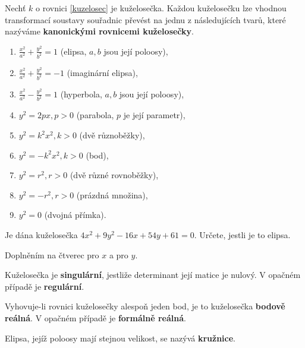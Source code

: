 \begin{definition}
    Nechť $k$ o rovnici \ref{kuzelosec} je kuželosečka. Každou kuželosečku lze
    vhodnou transformací soustavy souřadnic převést na jednu z následujících
    tvarů, které nazýváme \textbf{kanonickými rovnicemi kuželosečky}.
    \begin{enumerate}[$i.$]
    \item $\frac{x^2}{a^2} + \frac{y^2}{b^2}=1$ (elipsa, $a,b$ jsou její poloosy),
   	\item $\frac{x^2}{a^2} + \frac{y^2}{b^2}=-1$ (imaginární elipsa),
   	\item $\frac{x^2}{a^2} - \frac{y^2}{b^2}=1$ (hyperbola, $a,b$ jsou její poloosy),
   	\item $y^2=2px, p>0$ (parabola, $p$ je její parametr),
   	\item $y^2 = k^2x^2, k>0$ (dvě různoběžky),
   	\item $y^2 = -k^2x^2, k>0$ (bod),
   	\item $y^2 = r^2, r>0$ (dvě různé rovnoběžky),
   	\item $y^2 = -r^2, r>0$ (prázdná množina),
   	\item $y^2=0$ (dvojná přímka).
    \end{enumerate}
\end{definition}

\begin{priklad}
Je dána kuželosečka $4x^2+9y^2-16x+54y+61=0.$ Určete, jestli je to elipsa.
\end{priklad}

\begin{reseni}
Doplněním na čtverec pro $x$ a pro $y$.
\end{reseni}







\begin{definition}
    Kuželosečka je \textbf{singulární}, jestliže determinant její matice je nulový.
    V opačném případě je \textbf{regulární}.
\end{definition}

\begin{definition}
    Vyhovuje-li rovnici kuželosečky alespoň jeden bod, je to kuželosečka
    \textbf{bodově reálná}. V opačném případě je \textbf{formálně reálná}.
\end{definition}

\begin{definition}
    Elipsa, jejíž poloosy mají stejnou velikost, se nazývá \textbf{kružnice}.
\end{definition}

